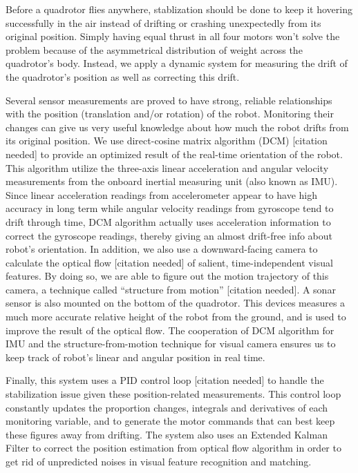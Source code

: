 \documentclass[12pt, letterpaper]{article}
\begin{document}
Before a quadrotor flies anywhere, stablization should be done to keep it hovering successfully in the air instead of drifting or crashing unexpectedly from its original position. Simply having equal thrust in all four motors won't solve the problem because of the asymmetrical distribution of weight across the quadrotor's body. Instead, we apply a dynamic system for measuring the drift of the quadrotor's position as well as correcting this drift.

Several sensor measurements are proved to have strong, reliable relationships with the position (translation and/or rotation) of the robot. Monitoring their changes can give us very useful knowledge about how much the robot drifts from its original position. We use direct-cosine matrix algorithm (DCM) [citation needed] to provide an optimized result of the real-time orientation of the robot. This algorithm utilize the three-axis linear acceleration and angular velocity measurements from the onboard inertial measuring unit (also known as IMU). Since linear acceleration readings from accelerometer appear to have high accuracy in long term while angular velocity readings from gyroscope tend to drift through time, DCM algorithm actually uses acceleration information to correct the gyroscope readings, thereby giving an almost drift-free info about robot's orientation. In addition, we also use a downward-facing camera to calculate the optical flow [citation needed] of salient, time-independent visual features. By doing so, we are able to figure out the motion trajectory of this camera, a technique called “structure from motion” [citation needed]. A sonar sensor is also mounted on the bottom of the quadrotor. This devices measures a much more accurate relative height of the robot from the ground, and is used to improve the result of the optical flow. The cooperation of DCM algorithm for IMU and the structure-from-motion technique for visual camera ensures us to keep track of robot's linear and angular position in real time.

Finally, this system uses a PID control loop [citation needed] to handle the stabilization issue given these position-related measurements. This control loop constantly updates the proportion changes, integrals and derivatives of each monitoring variable, and to generate the motor commands that can best keep these figures away from drifting. The system also uses an Extended Kalman Filter to correct the position estimation from optical flow algorithm in order to get rid of unpredicted noises in visual feature recognition and matching.
\end{document}
